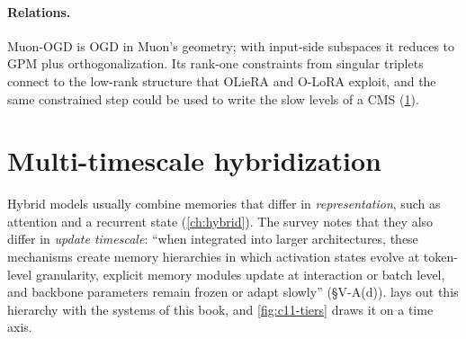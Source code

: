\paragraph{Relations.} Muon-OGD is OGD \citep{c11-farajtabar2020ogd} in Muon's geometry; with
input-side subspaces it reduces to GPM \citep{c11-saha2021gpm} plus orthogonalization. Its rank-one
constraints from singular triplets connect to the low-rank structure that OLieRA and O-LoRA
exploit, and the same constrained step could be used to write the slow levels of a CMS
(\cref{sec:c11-hybrid}).

\section{Multi-timescale hybridization}\label{sec:c11-hybrid}

Hybrid models usually combine memories that differ in \emph{representation}, such as attention
and a recurrent state (\cref{ch:hybrid}). The survey notes that they also differ in \emph{update
timescale}: ``when integrated into larger architectures, these mechanisms create memory
hierarchies in which activation states evolve at token-level granularity, explicit memory modules
update at interaction or batch level, and backbone parameters remain frozen or adapt slowly''
(\S V-A(d)).  lays out this hierarchy with the systems of this book, and
\cref{fig:c11-tiers} draws it on a time axis.

